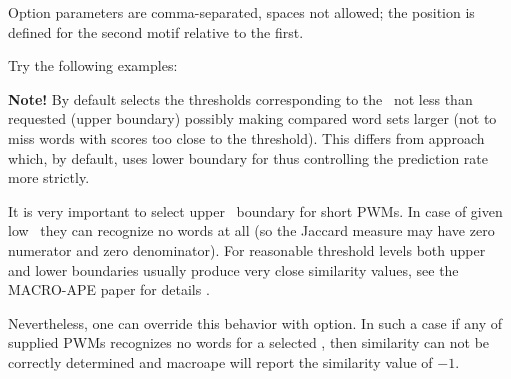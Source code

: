 
Option parameters are comma-separated, spaces not allowed; the position is defined for the second motif relative to the first.

Try the following examples:


{\small
\textbf{Note!} By default  selects the thresholds corresponding to the \pvalue\ not 
less than requested (upper boundary) possibly making compared word sets larger (not to miss words with scores too close to the threshold).
This differs from  approach which, by default, uses 
lower boundary for \pvalue thus controlling the prediction rate more strictly.

It is very important to select upper \pvalue\ boundary for short PWMs. In case of given 
low \pvalues\ they can recognize no words at all (so the Jaccard measure may have zero 
numerator and zero denominator). For reasonable threshold levels both upper and lower 
boundaries usually produce very close similarity values, see the MACRO-APE paper for details \cite{MACROAPE}.

Nevertheless, one can override this behavior with  option. In such a case if 
any of supplied PWMs recognizes no words for a selected \pvalue, then similarity can not be 
correctly determined and macroape will report the similarity value of $-1$. 
}
